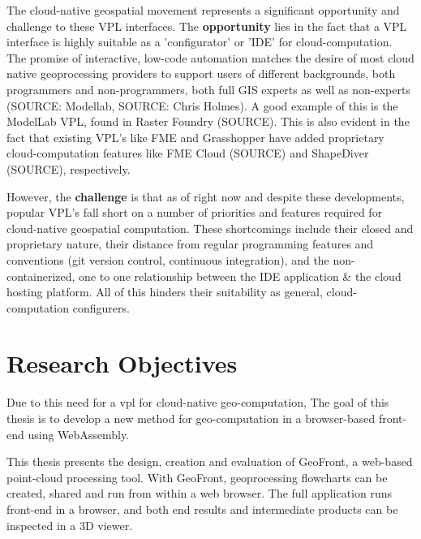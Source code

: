 The cloud-native geospatial movement represents a significant opportunity and challenge to these VPL interfaces. The \textbf{opportunity} lies in the fact that a VPL interface is highly suitable as a 'configurator' or 'IDE' for cloud-computation. The promise of interactive, low-code automation matches the desire of most cloud native geoprocessing providers to support users of different backgrounds, both programmers and non-programmers, both full GIS experts as well as non-experts (SOURCE: Modellab, SOURCE: Chris Holmes). A good example of this is the ModelLab VPL, found in Raster Foundry (SOURCE). This is also evident in the fact that existing VPL's like FME and Grasshopper have added proprietary cloud-computation features like FME Cloud (SOURCE) and ShapeDiver (SOURCE), respectively.

However, the \textbf{challenge} is that as of right now and despite these developments, popular VPL's fall short on a number of priorities and features required for cloud-native geospatial computation. 
These shortcomings include their closed and proprietary nature, their distance from regular programming features and conventions (git version control, continuous integration), and the non-containerized, one to one relationship between the IDE application \& the cloud hosting platform. All of this hinders their suitability as general, cloud-computation configurers. 




\section{Research Objectives}


Due to this need for a vpl for cloud-native geo-computation, The goal of this thesis is to develop a new method for geo-computation in a browser-based front-end using WebAssembly.

This thesis presents the design, creation and evaluation of GeoFront, a web-based point-cloud processing tool. 
With GeoFront, geoprocessing flowcharts can be created, shared and run from within a web browser.  
The full application runs front-end in a browser, and both end results and intermediate products can be inspected in a 3D viewer.

